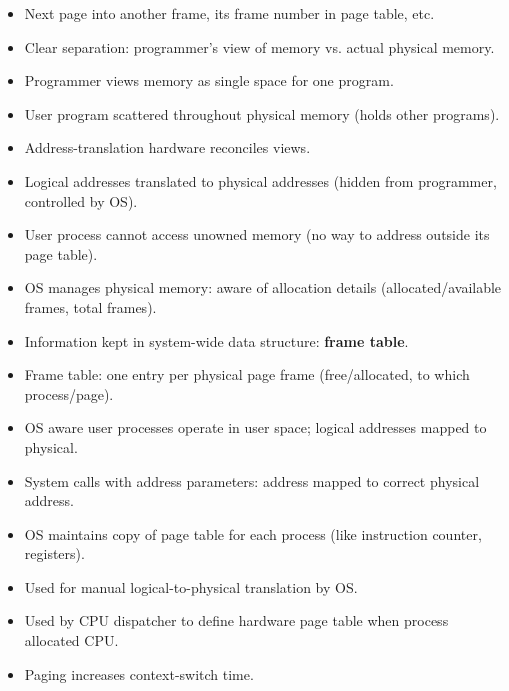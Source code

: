 \begin{itemize}
    \item Next page into another frame, its frame number in page table, etc.
    \item Clear separation: programmer's view of memory vs. actual physical memory.
    \item Programmer views memory as single space for one program.
    \item User program scattered throughout physical memory (holds other programs).
    \item Address-translation hardware reconciles views.
    \item Logical addresses translated to physical addresses (hidden from programmer, controlled by OS).
    \item User process cannot access unowned memory (no way to address outside its page table).
    \item OS manages physical memory: aware of allocation details (allocated/available frames, total frames).
    \item Information kept in system-wide data structure: \textbf{frame table}.
    \item Frame table: one entry per physical page frame (free/allocated, to which process/page).
    \item OS aware user processes operate in user space; logical addresses mapped to physical.
    \item System calls with address parameters: address mapped to correct physical address.
    \item OS maintains copy of page table for each process (like instruction counter, registers).
    \item Used for manual logical-to-physical translation by OS.
    \item Used by CPU dispatcher to define hardware page table when process allocated CPU.
    \item Paging increases context-switch time.
\end{itemize}

